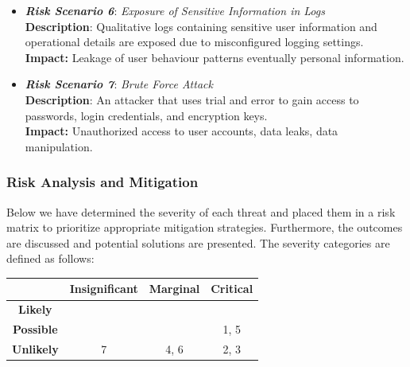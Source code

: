 \documentclass{article}
\begin{document}
\begin{itemize}
\item\textit{\textbf{Risk Scenario 6}}: \textit{Exposure of Sensitive Information in Logs} \\
\textbf{Description}: Qualitative logs containing sensitive user information and operational details are exposed due to misconfigured logging settings.\\
\textbf{Impact:} Leakage of user behaviour patterns eventually personal information.\\

\item\textit{\textbf{Risk Scenario 7}}: \textit{Brute Force Attack} \\
\textbf{Description}: An attacker that uses trial and error to gain access to passwords, login credentials, and encryption keys.\\
\textbf{Impact:} Unauthorized access to user accounts, data leaks, data manipulation.\\
\end{itemize}

\subsubsection{Risk Analysis and Mitigation}

Below we have determined the severity of each threat and placed them in a risk matrix to prioritize appropriate mitigation strategies. Furthermore, the outcomes are discussed and potential solutions are presented. The severity categories are defined as follows:


\begin{table}[h!]
\centering
\small
{} 
\renewcommand{\arraystretch}{1.5} 
\begin{tabular}{|c|c|c|c|}
\hline
\rowcolor{white}
& \textbf{Insignificant} & \textbf{Marginal} & \textbf{Critical} \\
\hline
\textbf{Likely} & \cellcolor{mediumrisk} & \cellcolor{highrisk} & \cellcolor{highrisk} \\
\hline
\textbf{Possible} & \cellcolor{lowrisk} & \cellcolor{mediumrisk}  & \cellcolor{highrisk} 1, 5 \\
\hline
\textbf{Unlikely} & \cellcolor{lowrisk} 7 & \cellcolor{lowrisk} 4, 6  & \cellcolor{mediumrisk} 2, 3 \\
\hline
\end{tabular}
\end{table}
\end{document}
